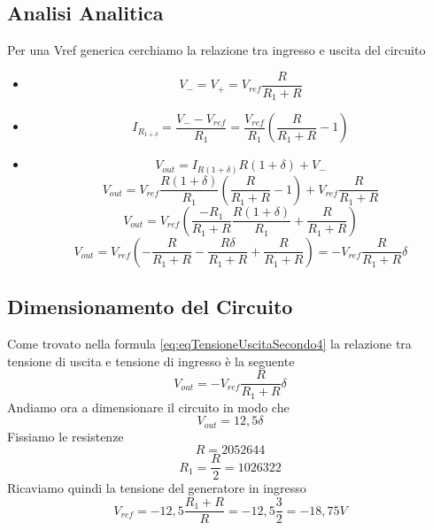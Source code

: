 \subsection{Analisi Analitica}\label{subsec:analisiAnaliticaSecondo}
Per una Vref generica cerchiamo la relazione tra ingresso e uscita del circuito
\begin{itemize}
\item 
    \begin{equation}\label{eq:eqMorsettiAmplificatoreSecondo}
    V_{-} = V_{+} = V_{ref} \dfrac{R}{R_{1} + R}
    \end{equation}
\item 
    \begin{equation}\label{eq:eqCorrenteRSecondo}
    I_{R_{1+\delta}} = \dfrac{V_{-} - V_{ref}}{R_{1}} = \dfrac{V_{ref}}{R_{1}} ( \dfrac{R}{R_{1} + R} - 1 )
    \end{equation}
\item
    \begin{equation}\label{eq:eqTensioneUscitaSecondo1}
    V_{out} = I_{R(1+\delta)} R(1+\delta) + V_{-}
    \end{equation}
    \begin{equation}\label{eq:eqTensioneUscitaSecondo2}
    V_{out} = V_{ref} \dfrac{R(1+\delta)}{R_{1}}(\dfrac{R}{R_{1} + R} - 1) + V_{ref} \dfrac{R}{R_{1} + R}
    \end{equation}
    \begin{equation}\label{eq:eqTensioneUscitaSecondo3}
    V_{out} = V_{ref} (\dfrac{-R_{1}}{R_{1} + R} \dfrac{R(1+\delta)}{R_{1}} + \dfrac{R}{R_{1} + R})  
    \end{equation}
    \begin{equation}\label{eq:eqTensioneUscitaSecondo4}
    V_{out} = V_{ref} (-\dfrac{R}{R_{1} + R} -\dfrac{R\delta}{R_{1} + R} + \dfrac{R}{R_{1} + R}) = - V_{ref} \dfrac{R}{R_{1} + R} \delta 
    \end{equation}
\end{itemize}

\subsection{Dimensionamento del Circuito}\label{subsec:dimensionamentoCircuito}
Come trovato nella formula \ref{eq:eqTensioneUscitaSecondo4} la relazione tra tensione di uscita e tensione di ingresso è la seguente $$V_{out} = - V_{ref} \dfrac{R}{R_{1} + R} \delta$$
Andiamo ora a dimensionare il circuito in modo che $$V_{out} = 12,5 \delta$$
Fissiamo le resistenze
$$R = 2052644$$
$$R_{1} = \dfrac{R}{2} = 1026322$$
Ricaviamo quindi la tensione del generatore in ingresso
\begin{equation}\label{eq:eqTensioneIngresso}
V_{ref} = -12,5\dfrac{R_{1} + R}{R} = -12,5\dfrac{3}{2} = -18,75 V
\end{equation}

